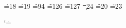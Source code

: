 \chardef\`=18	%
\chardef\'=19	%
\chardef\^=94	%
\chardef\~=126	%
\chardef\"=127	%
\chardef\c=24	%
\chardef\v=20	%
\chardef\r=23	%





\def\dot{\mathaccent"7005 }	%








\catcode`\"=\dblcode		%



